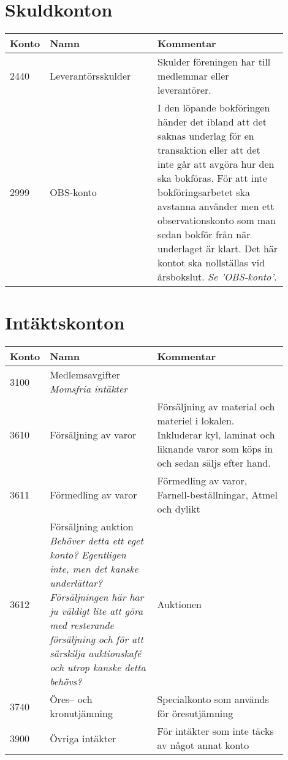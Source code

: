 \section{Skuldkonton}
\begin{minipage}{\fullwidthlength}
	\begin{longtable}[l]{l p{0.4\linewidth} p{0.5\linewidth}}
		Konto	&	Namn								& Kommentar \\ \toprule \endhead
		2440	&	Leverantörsskulder					& Skulder föreningen har till medlemmar eller leverantörer. \\
		2999	&	OBS-konto							& I den löpande bokföringen händer det ibland att det saknas underlag för en transaktion eller att det inte går att avgöra hur den ska bokföras. För att inte bokföringsarbetet ska avstanna använder men ett observationskonto som man sedan bokför från när underlaget är klart. Det här kontot ska nollställas vid årsbokslut. \emph{Se 'OBS-konto'}.
	\end{longtable}
\end{minipage}


\section{Intäktskonton}
\begin{minipage}{\fullwidthlength}
	\begin{longtable}[l]{l p{0.4\linewidth} p{0.5\linewidth}}
		Konto	&	Namn								& Kommentar \\ \toprule \endhead
		3100	&	Medlemsavgifter \newline \emph{Momsfria intäkter} \\
		3610	&	Försäljning av varor				& Försäljning av material och materiel i lokalen. Inkluderar kyl, laminat och liknande varor som köps in och sedan säljs efter hand.\\
		3611	&	Förmedling av varor					& Förmedling av varor, Farnell-beställningar, Atmel och dylikt\\
		3612	&	Försäljning auktion \emph{Behöver detta ett eget konto? Egentligen inte, men det kanske underlättar? Försäljningen här har ju väldigt lite att göra med resterande försäljning och för att särskilja auktionskafé och utrop kanske detta behövs?} & Auktionen\\
		3740	&	Öres-- och kronutjämning			& Specialkonto som används för öresutjämning\\
		3900	&	Övriga intäkter						& För intäkter som inte täcks av något annat konto
	\end{longtable}
\end{minipage}

